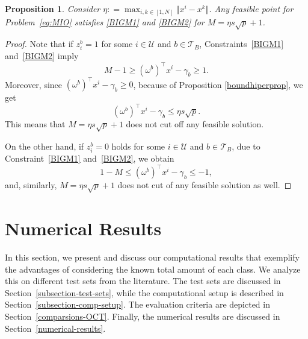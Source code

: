 \documentclass[a4paper,american,reqno]{amsart}
\newtheorem{prop}{Proposition}
\newcommand{\define}{\mathrel{{\mathop:}{=}}}
\begin{document}
\begin{prop}\label{prop:BIGM}
  Consider $\eta \define \max_{i,k \in [1,N]} \Vert x^i-x^k \Vert$.
  Any feasible point for Problem~\eqref{eq:MIO} satisfies
  \eqref{BIGM1} and \eqref{BIGM2} for
  $M = \eta s \sqrt{p} +1$.
\end{prop}
\begin{proof}
  Note that if $z_i^b =1$ for some $i \in \mathcal{U}$ and $b \in
  \mathcal{T}_B$, Constraints~\eqref{BIGM1} and~\eqref{BIGM2} imply
  \begin{equation*}
    M-1 \geq (\omega^b)^\top x^i - \gamma_b \geq 1.
  \end{equation*}
  Moreover, since $(\omega^b)^\top x^i - \gamma_b\geq 0$, because of
  Proposition \ref{boundhiperprop}, we get
  \begin{equation*}
    (\omega^b)^\top x^i - \gamma_b  \leq \eta s \sqrt{p}.
  \end{equation*}
  This means that $M = \eta s \sqrt{p} +1 $ does not cut off any
  feasible solution.

  On the other hand, if $z_i^b =0$ holds for some $i \in \mathcal{U}$
  and $b \in \mathcal{T}_B$, due to Constraint~\eqref{BIGM1}
  and~\eqref{BIGM2}, we obtain
  \begin{equation*}
    1 - M \leq (\omega^b)^\top x^i - \gamma_b \leq -1,
  \end{equation*}
  and, similarly, $M = \eta s \sqrt{p} +1$ does not cut of any
  feasible solution as well.
\end{proof}



\section{Numerical Results}
\label{sec:numerical-results}

In this section, we present and discuss our computational results that
exemplify the advantages of considering the known total amount of each
class. We analyze this on different test sets from the literature. The
test sets are discussed in Section~\ref{subsection-test-sets}, while
the computational setup is described in
Section~\ref{subsection-comp-setup}. The evaluation criteria are
depicted in Section~\ref{comparsions-OCT}. Finally, the numerical
results are discussed in Section~\ref{numerical-results}.


\end{document}
